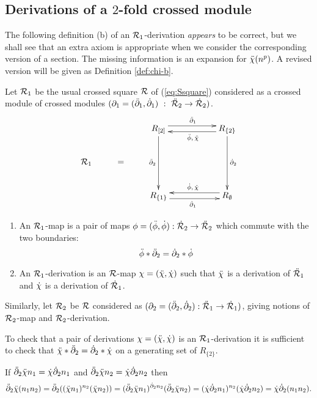 \subsection{Derivations of a $2$-fold crossed module} 
\label{subs:-der-xxmod}

The following definition (b) of an $\mathcal{R}_1$-derivation \emph{appears}
to be correct, but we shall see that an extra axiom is appropriate when 
we consider the corresponding version of a section.
The missing information is an expansion for $\ddot{\chi}(n^p)$.
A revised version will be given as Definition \ref{def:chi-b}.

\begin{defn} \label{def:chi-a}
Let ${\mathcal{R}_1}$ be the usual crossed square $\mathcal{R}$ of (\ref{eq:Ssquare}) 
considered as a crossed module of crossed modules  
$(\partial_1 = (\ddot{\partial}_1,\dot{\partial}_1) ~:~ \ddot{\mathcal{R}}_2 \to \dot{\mathcal{R}}_2)$.
\begin{equation} \label{eq:Rsqder}
\vcenter{\xymatrix{
        &   &    R_{[2]} \ar[rr] <+0.8ex>^{\ddbdyo} 
                         \ar[dd]_{\ddbdyt}
             &&  R_{\{2\}} \ar[ll] <+0.8ex>^{\ddph,\,\ddch} 
                           \ar[dd]^{\dbdyt} \\
\calR_1 & = &&&  \\
        &   &    R_{\{1\}} \ar[rr] <-0.8ex>_{\dbdyo}
             &&  R_{\emptyset} \ar[ll] <-0.8ex>_{\dph,\,\dch}
}} 
\end{equation}
\begin{enumerate}[\rm (a)]
\item 
An $\mathcal{R}_1$-map is a pair of maps 
$\phi = (\ddot{\phi}, \dot{\phi}) : \dot{\mathcal{R}}_2 \to \ddot{\mathcal{R}}_2$ which commute with the two 
boundaries:
$$ 
\ddot{\phi} \ast \ddot{\partial}_2 = \dot{\partial}_2 \ast \dot{\phi} 
$$
\item 
An $\mathcal{R}_1$-derivation is an $\mathcal{R}$-map $\chi = (\ddot{\chi}, \dot{\chi})$ 
such that $\ddot{\chi}$ is a derivation of $\ddot{\mathcal{R}}_1$ 
and $\dot{\chi}$ is a derivation of $\dot{\mathcal{R}}_1$.
\end{enumerate}

Similarly, let $\mathcal{R}_2$ be $\mathcal{R}$ considered as
$(\partial_2 = (\ddot{\partial}_2,\dot{\partial}_2) : \ddot{\mathcal{R}}_1 \to \dot{\mathcal{R}}_1)$,
giving notions of $\mathcal{R}_2$-map and $\mathcal{R}_2$-derivation.
\end{defn}

\begin{lem}
To check that a pair of derivations 
$\chi = (\ddot{\chi},\dot{\chi})$ is an $\mathcal{R}_1$-derivation
it is sufficient to check that $\ddot{\chi}\ast\ddot{\partial}_2 = \dot{\partial}_2\ast\dot{\chi}$
on a generating set of $R_{\{2\}}$.
\end{lem}
\begin{pf}
If $\ddot{\partial}_2\ddot{\chi} n_1 = \dot{\chi}\dot{\partial}_2 n_1$ 
and  $\ddot{\partial}_2\ddot{\chi} n_2 = \dot{\chi}\dot{\partial}_2 n_2$ then
$$
\ddot{\partial}_2\ddot{\chi}(n_1n_2)
= \ddot{\partial}_2((\ddot{\chi} n_1)^{n_2}(\ddot{\chi} n_2))
= (\ddot{\partial}_2\ddot{\chi} n_1)^{\dot{\partial}_2 n_2}(\ddot{\partial}_2\ddot{\chi} n_2)
= (\dot{\chi}\dot{\partial}_2 n_1)^{n_2}(\dot{\chi}\dot{\partial}_2 n_2)
= \dot{\chi}\dot{\partial}_2(n_1n_2).
$$ 
\end{pf}

